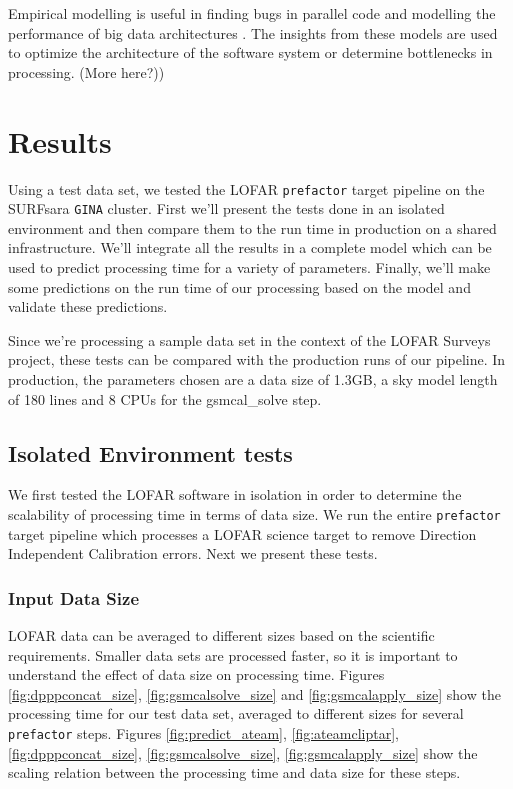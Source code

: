 \documentclass[preprint,5p]{elsarticle}
\begin{document}
Empirical modelling is useful in finding bugs in parallel code \citep{scalability_bugs} and modelling the performance of big data architectures \citep{mean_field_modeling}. The insights from these models are used to optimize the architecture of the software system or determine bottlenecks in processing. (More here?))



\section{Results}\label{sec:results}

Using a test data set, we tested the LOFAR \texttt{prefactor} target pipeline on the SURFsara \texttt{GINA} cluster. First we'll present the tests done in an isolated environment and then compare them to the run time in production on a shared infrastructure. We'll integrate all the results in a complete model which can be used to predict processing time for a variety of parameters. Finally, we'll make some predictions on the run time of our processing based on the model and validate these predictions. 

Since we're processing a sample data set in the context of the LOFAR Surveys project, these tests can be compared with the production runs of our pipeline. In production, the parameters chosen are a data size of 1.3GB, a sky model length of 180 lines and 8 CPUs for the gsmcal\_solve step. 


\subsection{Isolated Environment tests}
We first tested the LOFAR software in isolation in order to determine the scalability of processing time in terms of data size. We run the entire \texttt{prefactor} target pipeline which processes a LOFAR science target to remove Direction Independent Calibration errors. Next we present these tests.  

\subsubsection{Input Data Size}\label{sec:results_size}
LOFAR data can be averaged to different sizes based on the scientific requirements. Smaller data sets are processed faster, so it is important to understand the effect of data size on processing time. Figures \ref{fig:dpppconcat_size}, \ref{fig:gsmcalsolve_size} and \ref{fig:gsmcalapply_size}  show the processing time for our test data set, averaged to different sizes for several \texttt{prefactor} steps. Figures \ref{fig:predict_ateam}, \ref{fig:ateamcliptar}, \ref{fig:dpppconcat_size}, \ref{fig:gsmcalsolve_size}, \ref{fig:gsmcalapply_size} show the scaling relation between the processing time and data size for these steps. 
\end{document}

